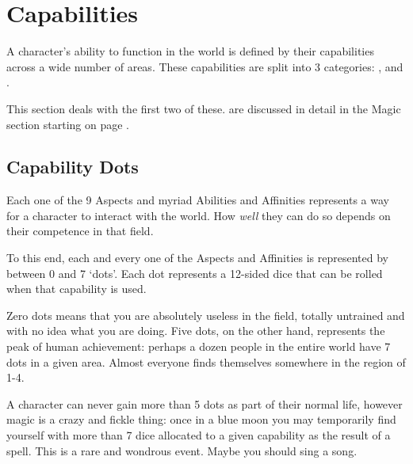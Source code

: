 
\newcommand\abilityRow[2]
{
	\imp{#1} & \parbox[t]{6.8 cm}{\raggedright #2} \\
}

\newcommand\abilityTable[1]
{
	\small
	\begin{center}
		\begin{rndtable}{r l}
		\bf Ability	& \bf Description \\
		#1
		\end{rndtable}
	\end{center}
}
\def\cc{\cellcolor{\tablecolorhead}\bf}
\newcommand\fourRow[4]{{\cc \bf \key{#1}}	&	\imp{#2}	&	\imp{#3}	&	\imp{#4} \\}



\chapter{Capabilities}\label{C:Aspects}

A character's ability to function in the world is defined by their capabilities across a wide number of areas. These capabilities are split into 3 categories: ,  and . 

This section deals with the first two of these.  are discussed in detail in the Magic section starting on page \pageref{C:Magic}.

\section{Capability Dots}

Each one of the 9 Aspects and myriad Abilities and Affinities represents a way for a character to interact with the world. How {\it well} they can do so depends on their competence in that field. 

To this end, each and every one of the Aspects and Affinities is represented by between 0 and 7 `dots'. Each dot represents a 12-sided dice that can be rolled when that capability is used. 

Zero dots means that you are absolutely useless in the field, totally untrained and with no idea what you are doing. Five dots, on the other hand, represents the peak of human achievement: perhaps a dozen people in the entire world have 7 dots in a given area. Almost everyone finds themselves somewhere in the region of 1-4. 

A character can never gain more than 5 dots as part of their normal life, however magic is a crazy and fickle thing: once in a blue moon you may temporarily find yourself with more than 7 dice allocated to a given capability as the result of a spell. This is a rare and wondrous event. Maybe you should sing a song. 

